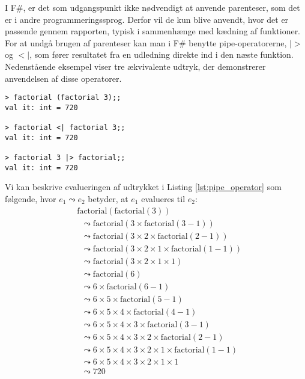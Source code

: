 I F\#, er det som udgangspunkt ikke nødvendigt at anvende parenteser, som det er i andre programmeringssprog. Derfor vil de kun blive anvendt, hvor det er passende gennem rapporten, typisk i sammenhænge med kædning af funktioner. For at undgå brugen af parenteser kan man i F\# benytte pipe-operatorerne, $|>$ og $<|$, som fører resultatet fra en udledning direkte ind i den næste funktion. Nedenstående eksempel viser tre ækvivalente udtryk, der demonstrerer anvendelsen af disse operatorer.

\begin{lstlisting}[style=output, label={lst:pipe_operator}, caption={Eksempel på anvendelse af pipe-operatorer i F\# ved udregning af $(3!)! = 6! = 720 $.}]
> factorial (factorial 3);;
val it: int = 720

> factorial <| factorial 3;;
val it: int = 720

> factorial 3 |> factorial;;
val it: int = 720
\end{lstlisting}

Vi kan beskrive evalueringen af udtrykket i Listing \ref{lst:pipe_operator} som følgende, hvor $e_1 \leadsto e_2$ betyder, at $e_1$ evalueres til $e_2$:
\[
\begin{aligned}
&\text{factorial}(\text{factorial}(3)) \\
&\;\;\leadsto \text{factorial}(3 \times \text{factorial}(3 - 1)) \\
&\;\;\leadsto \text{factorial}(3 \times 2 \times \text{factorial}(2 - 1)) \\
&\;\;\leadsto \text{factorial}(3 \times 2 \times 1 \times \text{factorial}(1 - 1)) \\
&\;\;\leadsto \text{factorial}(3 \times 2 \times 1 \times 1) \\
&\;\;\leadsto \text{factorial}(6) \\
&\;\;\leadsto 6 \times \text{factorial}(6 - 1) \\
&\;\;\leadsto 6 \times 5 \times \text{factorial}(5 - 1) \\
&\;\;\leadsto 6 \times 5 \times 4 \times \text{factorial}(4 - 1) \\
&\;\;\leadsto 6 \times 5 \times 4 \times 3 \times \text{factorial}(3 - 1) \\
&\;\;\leadsto 6 \times 5 \times 4 \times 3 \times 2 \times \text{factorial}(2 - 1) \\
&\;\;\leadsto 6 \times 5 \times 4 \times 3 \times 2 \times 1 \times \text{factorial}(1 - 1) \\
&\;\;\leadsto 6 \times 5 \times 4 \times 3 \times 2 \times 1 \times 1 \\
&\;\;\leadsto 720
\end{aligned}
\]


